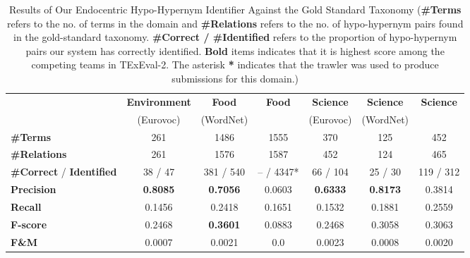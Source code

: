 \begin{table}[H]
\centering
    \begin{tabular}{l|c|cc|ccc}
    ~                         & \textbf{Environment} & \textbf{Food}  & \textbf{Food}          & \textbf{Science}  & \textbf{Science} & \textbf{Science}   \\
    ~                         & (Eurovoc) & (WordNet) &           & (Eurovoc) & (WordNet) &    \\
    
     \hline
    \textbf{\#Terms }                  & 261                   & 1486           & 1555          & 370               & 125               & 452       \\
    \textbf{\#Relations}               & 261                   & 1576           & 1587          & 452               & 124               & 465       \\ \hline
    \textbf{\#Correct} / \textbf{Identified}  & 38 / 47               & 381 / 540      &  -- / 4347*  & 66 / 104          & 25 / 30           & 119 / 312 \\
    \textbf{Precision}                 & \textbf{0.8085}                & \textbf{0.7056}         & 0.0603        & \textbf{0.6333}            & \textbf{0.8173}            & 0.3814    \\
    \textbf{Recall}                    & 0.1456                & 0.2418         & 0.1651        & 0.1532            & 0.1881            & 0.2559    \\ \hline
    \textbf{F-score}                   & 0.2468                & \textbf{0.3601}         & 0.0883        & 0.2468            & 0.3058            & 0.3063    \\
    \textbf{F\&M }                     & 0.0007                & 0.0021         & 0.0           & 0.0023            & 0.0008            & 0.0020    \\
    \end{tabular}
\caption{Results of Our Endocentric Hypo-Hypernym Identifier Against the Gold Standard Taxonomy (\textbf{\#Terms} refers to the no. of terms in the domain and \textbf{\#Relations} refers to the no. of hypo-hypernym pairs found in the gold-standard taxonomy. \textbf{\#Correct / \#Identified} refers to the proportion of hypo-hypernym pairs our system has correctly identified. \textbf{Bold} items indicates that it is highest score among the competing teams in TExEval-2. The asterisk \textbf{*} indicates that the trawler was used to produce submissions for this domain.)}
\end{table}

